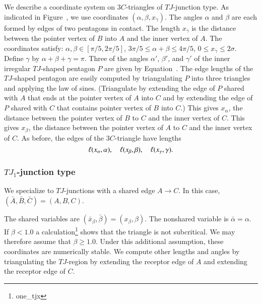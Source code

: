 We describe a coordinate system on $3C$-triangles of $TJ$-junction
type.  As indicated in Figure~, we use coordinates
$(\alpha,\beta,x_\gamma)$.  The angles $\alpha$ and $\beta$ are each
formed by edges of two pentagons in contact.  The length $x_\gamma$ is
the distance between the pointer vertex of $B$ into $A$ and the inner
vertex of $A$.  The coordinates satisfy:
$\alpha,\beta\in[\pi/5,2\pi/5]$, $3\pi/5\le \alpha+\beta\le 4\pi/5$,
$0\le x_\gamma\le 2\sigma$.  Define $\gamma$ by
$\alpha+\beta+\gamma=\pi$.  Three of the angles $\alpha'$, $\beta'$,
and $\gamma'$ of the inner irregular $TJ$-shaped pentagon $P$ are
given by Equation~.  The edge lengths of the $TJ$-shaped
pentagon are easily computed by triangulating $P$ into three triangles
and applying the law of sines.  (Triangulate by extending the edge of
$P$ shared with $A$ that ends at the pointer vertex of $A$ into $C$
and by extending the edge of $P$ shared with $C$ that contains pointer
vertex of $B$ into $C$.)  This gives $x_\alpha$, the distance between
the pointer vertex of $B$ to $C$ and the inner vertex of $C$.  This
gives $x_\beta$, the distance between the pointer vertex of $A$ to $C$
and the inner vertex of $C$.  As before, the edges of the
$3C$-triangle have lengths
\[
\ell(x_\alpha,\alpha),\quad \ell(x_\beta,\beta),\quad \ell(x_\gamma,\gamma).
\]




\subsubsection{$TJ_1$-junction type}

We specialize to $TJ$-junctions with a shared edge $A\to C$.  In this
case, $(\bar A,\bar B,\bar C)=(A,B,C)$.

The shared variables are $(\bar x_\beta,\bar\beta)=(x_\beta,\beta)$.
The nonshared variable is $\bar\alpha=\alpha$.  If $\beta < 1.0$ a
calculation\footnote{one\_tjx} shows that the triangle is not
subcritical.  We may therefore assume that $\beta \ge 1.0$.  Under
this additional assumption, these coordinates are numerically stable.
We compute other lengths and angles by triangulating the $TJ$-region
by extending the receptor edge of $A$ and extending the receptor edge
of $C$.

